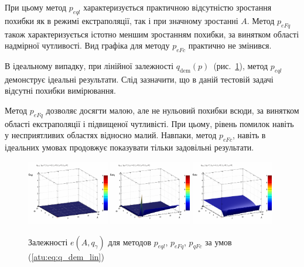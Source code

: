 При цьому метод
$ p_{eql} $ характеризується практичною відсутністю зростання
похибки як в режимі екстраполяції, так і при значному зростанні
$ A $. Метод
$ p_{eFq} $ також характеризується істотно меншим зростанням
похибки, за винятком області надмірної чутливості. Вид графіка
для методу
$ p_{eFc} $ практично не змінився.

В ідеальному випадку, при лінійної залежності
$ q_\mathrm{dem} (p) $~(рис.~\ref{atu:f:qsl_pe_A_qg_lin}), метод
$ p_{eql} $ демонструє ідеальні результати. Слід зазначити, що в
даній тестовій задачі відсутні похибки вимірювання.

Метод
$ p_{eFq} $ дозволяє досягти малою, але не нульовий
похибки всюди, за винятком області екстраполяції і підвищеної
чутливісті. При цьому, рівень помилок навіть у несприятливих
областях відносно малий. Навпаки, метод
$ p_{eFc} $, навіть в ідеальних умовах продовжує показувати тільки задовільні
результати.

\begin{figure}[htb!]
  \begin{center}
    \includegraphics[width=0.32\textwidth]{p/qls_pe-p_A_qg_eql_lin.png}
    \hfill
    \includegraphics[width=0.32\textwidth]{p/qls_pe-p_A_qg_eFq_lin.png}
    \hfill
    \includegraphics[width=0.32\textwidth]{p/qls_pe-p_A_qg_eFc_lin.png}
  \end{center}
  \caption{Залежності $e(A,q_\gamma)$ для методов $p_{eql}$, $p_{eFq}$, $p_{qFc}$ за умов (\ref{atu:eq:q_dem_lin})}
  \label{atu:f:qsl_pe_A_qg_lin}
\end{figure}

